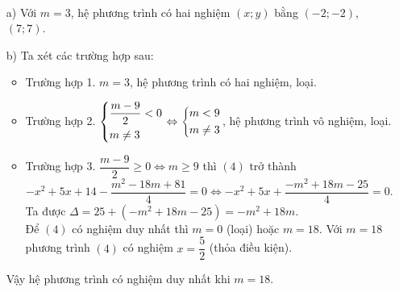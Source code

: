 \begin{bt}
{\begin{eqnarray*}
			\end{eqnarray*}
		\begin{itemize}
			\item[a)] Với $m=3$, hệ phương trình có hai nghiệm $(x;y)$ bằng $(-2;-2)$, $(7;7)$.	
			\item[b)] Ta xét các trường hợp sau:
				\begin{itemize}
					\item Trường hợp 1. $ m = 3$, hệ phương trình có hai nghiệm, loại.
					\item Trường hợp 2. $\left\{\begin{aligned}&\dfrac{m-9}{2} < 0\\&m \ne 3\end{aligned}\right. \Leftrightarrow \left\{\begin{aligned}& m<9\\& m \ne 3\end{aligned}\right.$, hệ phương trình vô nghiệm, loại.
					\item Trường hợp 3. $ \dfrac{m-9}{2} \ge 0 \Leftrightarrow m \ge 9$ thì $(4)$ trở thành
					$$- x^2 + 5x + 14 - \dfrac{m^2 - 18m + 81}{4} = 0 \Leftrightarrow
					- x^2 + 5x + \dfrac{-m^2 + 18m - 25}{4} = 0.$$
					Ta được $\Delta = 25 + (-m^2 + 18m -25) = -m^2 + 18m$.\\
					Để $(4)$ có nghiệm duy nhất thì $m = 0$ (loại) hoặc $m = 18$. Với $m = 18$ phương trình $(4)$ có nghiệm $x = \dfrac{5}{2}$ (thỏa điều kiện).
				\end{itemize}
			Vậy hệ phương trình có nghiệm duy nhất khi $m = 18$.
		\end{itemize}
	}
\end{bt}












